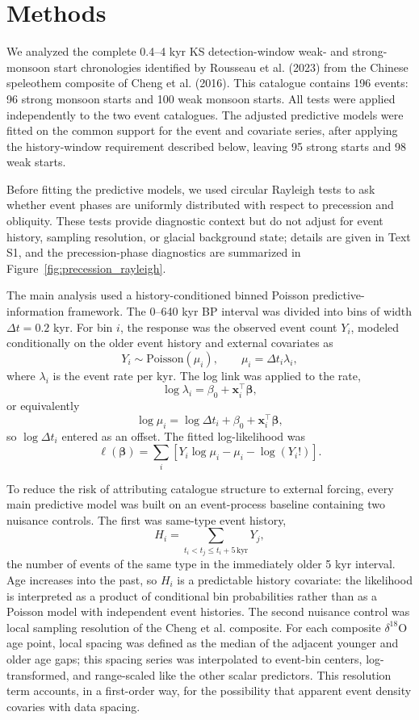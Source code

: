 \documentclass[11pt]{article}
\begin{document}
\section*{Methods}

We analyzed the complete 0.4--4 kyr KS detection-window weak- and strong-monsoon start chronologies identified by Rousseau et al. (2023) from the Chinese speleothem composite of Cheng et al. (2016). This catalogue contains 196 events: 96 strong monsoon starts and 100 weak monsoon starts. All tests were applied independently to the two event catalogues. The adjusted predictive models were fitted on the common support for the event and covariate series, after applying the history-window requirement described below, leaving 95 strong starts and 98 weak starts.

Before fitting the predictive models, we used circular Rayleigh tests to ask whether event phases are uniformly distributed with respect to precession and obliquity. These tests provide diagnostic context but do not adjust for event history, sampling resolution, or glacial background state; details are given in Text S1, and the precession-phase diagnostics are summarized in Figure~\ref{fig:precession_rayleigh}.

The main analysis used a history-conditioned binned Poisson predictive-information framework. The 0--640 kyr BP interval was divided into bins of width \(\Delta t=0.2\) kyr. For bin \(i\), the response was the observed event count \(Y_i\), modeled conditionally on the older event history and external covariates as
\[
Y_i \sim \mathrm{Poisson}(\mu_i),
\qquad
\mu_i = \Delta t_i \lambda_i ,
\]
where \(\lambda_i\) is the event rate per kyr. The log link was applied to the rate,
\[
\log \lambda_i = \beta_0+\mathbf{x}_i^{\top}\boldsymbol{\beta},
\]
or equivalently
\[
\log \mu_i = \log \Delta t_i+\beta_0+\mathbf{x}_i^{\top}\boldsymbol{\beta},
\]
so \(\log \Delta t_i\) entered as an offset. The fitted log-likelihood was
\[
\ell(\boldsymbol{\beta})=
\sum_i
\left[
Y_i\log\mu_i-\mu_i-\log(Y_i!)
\right].
\]

To reduce the risk of attributing catalogue structure to external forcing, every main predictive model was built on an event-process baseline containing two nuisance controls. The first was same-type event history,
\[
H_i=\sum_{t_i<t_j\leq t_i+5\,\mathrm{kyr}} Y_j ,
\]
the number of events of the same type in the immediately older 5 kyr interval. Age increases into the past, so \(H_i\) is a predictable history covariate: the likelihood is interpreted as a product of conditional bin probabilities rather than as a Poisson model with independent event histories. The second nuisance control was local sampling resolution of the Cheng et al. composite. For each composite \(\delta^{18}\mathrm{O}\) age point, local spacing was defined as the median of the adjacent younger and older age gaps; this spacing series was interpolated to event-bin centers, log-transformed, and range-scaled like the other scalar predictors. This resolution term accounts, in a first-order way, for the possibility that apparent event density covaries with data spacing.
\end{document}
